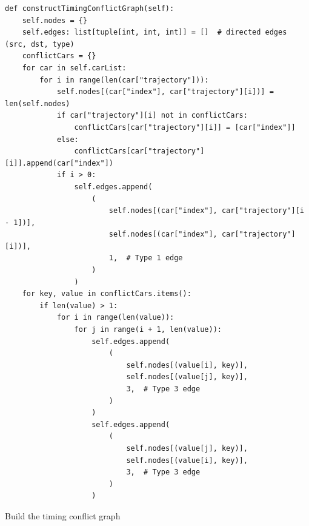\documentclass{article}
\begin{document}
\begin{listing}[H]
    \begin{verbatim}
def constructTimingConflictGraph(self):
    self.nodes = {}
    self.edges: list[tuple[int, int, int]] = []  # directed edges (src, dst, type)
    conflictCars = {}
    for car in self.carList:
        for i in range(len(car["trajectory"])):
            self.nodes[(car["index"], car["trajectory"][i])] = len(self.nodes)
            if car["trajectory"][i] not in conflictCars:
                conflictCars[car["trajectory"][i]] = [car["index"]]
            else:
                conflictCars[car["trajectory"][i]].append(car["index"])
            if i > 0:
                self.edges.append(
                    (
                        self.nodes[(car["index"], car["trajectory"][i - 1])],
                        self.nodes[(car["index"], car["trajectory"][i])],
                        1,  # Type 1 edge
                    )
                )
    for key, value in conflictCars.items():
        if len(value) > 1:
            for i in range(len(value)):
                for j in range(i + 1, len(value)):
                    self.edges.append(
                        (
                            self.nodes[(value[i], key)],
                            self.nodes[(value[j], key)],
                            3,  # Type 3 edge
                        )
                    )
                    self.edges.append(
                        (
                            self.nodes[(value[j], key)],
                            self.nodes[(value[i], key)],
                            3,  # Type 3 edge
                        )
                    )
    \end{verbatim}
    \caption{Build the timing conflict graph}
    \label{lst:build-timing-conflict-graph}
\end{listing}
\end{document}
